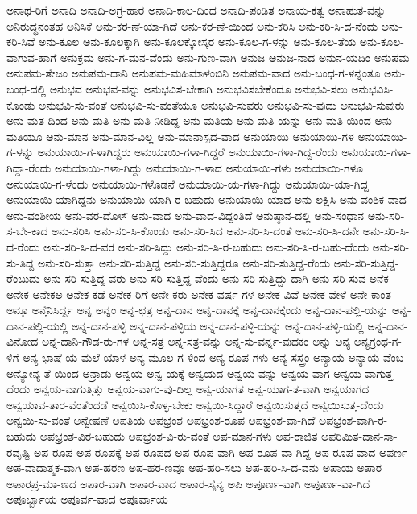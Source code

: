 ಅನಾಥ-ರಿಗೆ
ಅನಾದಿ
ಅನಾದಿ-ಅಗ್ರ-ಹಾರ
ಅನಾದಿ-ಕಾಲ-ದಿಂದ
ಅನಾದಿ-ಪಂಡಿತ
ಅನಾಯ-ಕತ್ವ
ಅನಾಹುತ-ವನ್ನು
ಅನಿರುದ್ಧನಂತಹ
ಅನಿಸಿಕೆ
ಅನು-ಕರ-ಣೆ-ಯಾ-ಗಿದೆ
ಅನು-ಕರ-ಣೆ-ಯಿಂದ
ಅನು-ಕರಿಸಿ
ಅನು-ಕರಿ-ಸಿ-ದ-ನೆಂದು
ಅನು-ಕರಿ-ಸಿವೆ
ಅನು-ಕೂಲ
ಅನು-ಕೂಲಕ್ಕಾಗಿ
ಅನು-ಕೂಲಕ್ಕೋಸ್ಕರ
ಅನು-ಕೂಲ-ಗ-ಳನ್ನು
ಅನು-ಕೂಲ-ತೆಯ
ಅನು-ಕೂಲ-ವಾಗುವ-ಹಾಗೆ
ಅನುಕ್ರಮ
ಅನು-ಗ-ಮನ-ವೆಂದು
ಅನು-ಗುಣ-ವಾಗಿ
ಅನುಜ
ಅನುಜ-ನಾದ
ಅನುನ-ಯದಿಂ
ಅನುಪಮ
ಅನುಪಮ-ತೇಜಂ
ಅನುಪಮ-ದಾನಿ
ಅನುಪಮ-ಮಹಿಮಾಳಂಬಿನಿ
ಅನುಪಮ-ವಾದ
ಅನು-ಬಂಧ-ಗ-ಳನ್ನಂತೂ
ಅನು-ಬಂಧ-ದಲ್ಲಿ
ಅನುಭವ
ಅನುಭವ-ವನ್ನು
ಅನುಭವಿಸ-ಬೇಕಾಗಿ
ಅನುಭವಿಸಬೇಕೆಂದೂ
ಅನುಭವಿ-ಸಲು
ಅನುಭವಿಸಿ-ಕೊಂಡು
ಅನುಭವಿ-ಸು-ವಂತೆ
ಅನುಭವಿ-ಸು-ವಂತೆಯೂ
ಅನುಭವಿ-ಸುವರು
ಅನುಭವಿ-ಸು-ವುದು
ಅನುಭವಿ-ಸುವುರು
ಅನು-ಮತ-ದಿಂದ
ಅನು-ಮತಿ
ಅನು-ಮತಿ-ನೀಡಿದ್ದ
ಅನು-ಮತಿಯ
ಅನು-ಮತಿ-ಯನ್ನು
ಅನು-ಮತಿ-ಯಿಂದ
ಅನು-ಮತಿಯೂ
ಅನು-ಮಾನ
ಅನು-ಮಾನ-ವಿಲ್ಲ
ಅನು-ಮಾನಾಸ್ಪದ-ವಾದ
ಅನುಯಾಯಿ
ಅನುಯಾಯಿ-ಗಳ
ಅನುಯಾಯಿ-ಗ-ಳನ್ನು
ಅನುಯಾಯಿ-ಗ-ಳಾಗಿದ್ದರು
ಅನುಯಾಯಿ-ಗಳಾ-ಗಿದ್ದರೆ
ಅನುಯಾಯಿ-ಗಳಾ-ಗಿದ್ದ-ರೆಂದು
ಅನುಯಾಯಿ-ಗಳಾ-ಗಿದ್ದಾ-ರೆಂದು
ಅನುಯಾಯಿ-ಗಳಾ-ಗಿದ್ದು
ಅನುಯಾಯಿ-ಗ-ಳಾದ
ಅನುಯಾಯಿ-ಗಳು
ಅನುಯಾಯಿ-ಗಳೂ
ಅನುಯಾಯಿ-ಗ-ಳೆಂದು
ಅನುಯಾಯಿ-ಗಳೊಡನೆ
ಅನುಯಾಯಿ-ಯ-ಗಳಾ-ಗಿದ್ದು
ಅನುಯಾಯಿ-ಯಾ-ಗಿದ್ದ
ಅನುಯಾಯಿ-ಯಾಗಿದ್ದನು
ಅನುಯಾಯಿ-ಯಾಗಿ-ರ-ಬಹುದು
ಅನುಯಾಯಿ-ಯಾದ
ಅನು-ಲಕ್ಷಿಸಿ
ಅನು-ವಂಶಿಕ-ವಾದ
ಅನು-ವಂಶೀಯ
ಅನು-ವರ-ದೊಳ್
ಅನು-ವಾದ
ಅನು-ವಾದ-ವಿದ್ದಂತಿದೆ
ಅನುಷ್ಠಾನ-ದಲ್ಲಿ
ಅನು-ಸಂಧಾನ
ಅನು-ಸರಿ-ಸ-ಬೇ-ಕಾದ
ಅನು-ಸರಿಸಿ
ಅನು-ಸರಿ-ಸಿ-ಕೊಂಡು
ಅನು-ಸರಿ-ಸಿದ
ಅನು-ಸರಿ-ಸಿ-ದಂತೆ
ಅನು-ಸರಿ-ಸಿ-ದನೇ
ಅನು-ಸರಿ-ಸಿ-ದ-ರೆಂದು
ಅನು-ಸರಿ-ಸಿ-ದ-ವರ
ಅನು-ಸರಿ-ಸಿದ್ದು
ಅನು-ಸರಿ-ಸಿ-ರ-ಬಹುದು
ಅನು-ಸರಿ-ಸಿ-ರ-ಬಹು-ದೆಂದು
ಅನು-ಸರಿ-ಸು-ತಿದ್ದ
ಅನು-ಸರಿ-ಸುತ್ತಾ
ಅನು-ಸರಿ-ಸುತ್ತಿದ್ದ
ಅನು-ಸರಿ-ಸುತ್ತಿದ್ದರೂ
ಅನು-ಸರಿ-ಸುತ್ತಿದ್ದ-ರೆಂದು
ಅನು-ಸರಿ-ಸುತ್ತಿದ್ದ-ರೆಂಬುದು
ಅನು-ಸರಿ-ಸುತ್ತಿದ್ದ-ವರು
ಅನು-ಸರಿ-ಸುತ್ತಿದ್ದ-ವೆಂದು
ಅನು-ಸರಿ-ಸುತ್ತಿದ್ದು-ದಾಗಿ
ಅನು-ಸರಿ-ಸುವ
ಅನೆಕ
ಅನೇಕ
ಅನೇಕಅ
ಅನೇಕ-ಕಡೆ
ಅನೇಕ-ರಿಗೆ
ಅನೇ-ಕರು
ಅನೇಕ-ವರ್ಷ-ಗಳ
ಅನೇಕ-ವಿವೆ
ಅನೇಕ-ವೇಳೆ
ಅನೇ-ಕಾಂತ
ಅನ್ತೂ
ಅನ್ತೆನಿಸಿರ್ದ್ದ
ಅನ್ನ
ಅನ್ನಂ
ಅನ್ನ-ಛತ್ರ
ಅನ್ನ-ದಾನ
ಅನ್ನ-ದಾನಕ್ಕೆ
ಅನ್ನ-ದಾನಕ್ಕೆಂದು
ಅನ್ನ-ದಾನ-ಪಲ್ಲಿ-ಯನ್ನು
ಅನ್ನ-ದಾನ-ಪಲ್ಲಿ-ಯಲ್ಲಿ
ಅನ್ನ-ದಾನ-ಪಳ್ಳಿ
ಅನ್ನ-ದಾನ-ಪಳ್ಳಿಯ
ಅನ್ನ-ದಾನ-ಪಳ್ಳಿ-ಯನ್ನು
ಅನ್ನ-ದಾನ-ಪಳ್ಳಿ-ಯಲ್ಲಿ
ಅನ್ನ-ದಾನ-ವಿನೋದ
ಅನ್ನ-ದಾನಿ-ಗೌಡ-ರು-ಗಳ
ಅನ್ನ-ಸತ್ರ
ಅನ್ನ-ಸತ್ರ-ವನ್ನು
ಅನ್ನ-ಸು-ವರ್ನ್ನ-ವುದಕಂ
ಅನ್ನು
ಅನ್ಯ
ಅನ್ಯಗ್ರಂಥ-ಗ-ಳಿಗೆ
ಅನ್ಯ-ಭಾಷೆ-ಯ-ಮಲೆ-ಯಾಳ
ಅನ್ಯ-ಮೂಲ-ಗ-ಳಿಂದ
ಅನ್ಯ-ರೂಪ-ಗಳು
ಅನ್ಯ-ಸಸ್ತ್ರಂ
ಅನ್ಯಾಯ
ಅನ್ಯಾಯ-ವೆಂಬ
ಅನ್ಯೋನ್ಯ-ತೆ-ಯಿಂದ
ಅನ್ರಾಡು
ಅನ್ವಯ
ಅನ್ವ-ಯಕ್ಕೆ
ಅನ್ವಯದ
ಅನ್ವಯ-ವನ್ನು
ಅನ್ವಯ-ವಾಗ
ಅನ್ವಯ-ವಾಗುತ್ತ-ದೆಂದು
ಅನ್ವಯ-ವಾಗುತ್ತಿತ್ತು
ಅನ್ವಯ-ವಾಗು-ವು-ದಿಲ್ಲ
ಅನ್ವ-ಯಾಗತ
ಅನ್ವ-ಯಾಗ-ತ-ವಾಗಿ
ಅನ್ವಯಾಗದ
ಅನ್ವಯಾವ-ತಾರ-ವೆಂತೆಂದಡೆ
ಅನ್ವಯಿಸಿ-ಕೊಳ್ಳ-ಬೇಕು
ಅನ್ವಯಿ-ಸಿದ್ದಾರೆ
ಅನ್ವಯಿಸುತ್ತದೆ
ಅನ್ವಯಿಸುತ್ತ-ದೆಂದು
ಅನ್ವಯಿ-ಸು-ವಂತೆ
ಅನ್ವೇಷಣೆ
ಅಪತಿಯ
ಅಪಭ್ರಂಶ
ಅಪಭ್ರಂಶ-ರೂಪ
ಅಪಭ್ರಂಶ-ವಾ-ಗಿದೆ
ಅಪಭ್ರಂಶ-ವಾಗಿ-ರ-ಬಹುದು
ಅಪಭ್ರಂಶ-ವಿರ-ಬಹುದು
ಅಪಭ್ರಂಶ-ವಿ-ರು-ವಂತೆ
ಅಪ-ಮಾನ-ಗಳು
ಅಪ-ರಾಜಿತ
ಅಪರಿಮಿತ-ದಾನ-ಸಾ-ರವೃಷ್ಟಿ
ಅಪ-ರೂಪ
ಅಪ-ರೂಪಕ್ಕೆ
ಅಪ-ರೂಪದ
ಅಪ-ರೂಪ-ವಾಗಿ
ಅಪ-ರೂಪ-ವಾ-ಗಿದ್ದ
ಅಪ-ರೂಪ-ವಾದ
ಅಪರ್ಣ
ಅಪ-ವಾದಾತ್ಮಕ-ವಾಗಿ
ಅಪ-ಹರಣ
ಅಪ-ಹರ-ಣವೂ
ಅಪ-ಹರಿ-ಸಲು
ಅಪ-ಹರಿ-ಸಿ-ದ-ವನು
ಅಪಾಯ
ಅಪಾರ
ಅಪಾರಪ್ರ-ಮಾ-ಣದ
ಅಪಾರ-ವಾಗಿ
ಅಪಾರ-ವಾದ
ಅಪಾರ-ಸೈನ್ಯ
ಅಪಿ
ಅಪೂರ್ಣ-ವಾಗಿ
ಅಪೂರ್ಣ-ವಾ-ಗಿದೆ
ಅಪೂರ್ಬ್ಬಾಯ
ಅಪೂರ್ವ-ವಾದ
ಅಪೂರ್ವಾಯ
